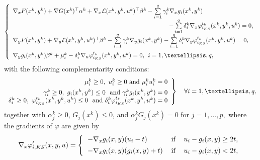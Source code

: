       	\begin{equation}
       	\left\{
       	\begin{array}
       	[c]{l}
       	\nabla_{x}F(x^{k},y^{k})+\nabla G(x^{k})^{\top}\alpha^{k}+\nabla
       	_{x}\mathcal{L}(x^{k},y^{k},u^{k})^{\top}\beta^{k}-\sum\limits_{i=1}^{q}
       	\gamma_{i}^{k}\nabla_{x}g_{i}(x^{k},y^{k})\\
       	\qquad \qquad \qquad \qquad \qquad \qquad \qquad \qquad \qquad\qquad \qquad \qquad \quad \;\, -\sum\limits_{i=1}^{q}\delta_{i}^{k}\nabla_{x}\varphi_{{i}_{KS}}^{t_{k}}(x^{k},y^{k},u^{k})=0,\\
       	\nabla_{y}F(x^{k},y^{k})+\nabla_{y}\mathcal{L}(x^{k},y^{k},u^{k})^{\top}
       	\beta^{k}-\sum\limits_{i=1}^{q}\gamma_{i}^{k}\nabla_{y}g_{i}(x^{k},y^{k}
       	)
       	-\sum\limits_{i=1}^{q}\delta_{i}^{k}\nabla_{y}\varphi_{{i}_{KS}}^{t_{k}}(x^{k},y^{k},u^{k})=0,\medskip \\
       	\nabla_{y}g_{i}(x^{k},y^{k})\beta^{k}+\mu_{i}^{k}-\delta_{i}^{k}\nabla_{u}
       	\varphi_{{i}_{KS}}^{t_{k}}(x^{k},y^{k},u^{k})=0, \;\, i=1,\ldots,q,
       	\end{array}
       	\right. \label{k13bis}
       	\end{equation}
       	with the following complementarity conditions:
       	\begin{equation}
       	\left.
       	\begin{array}[c]{r}
       	\mu_{i}^{k}\geq0,\text{ }u_{i}^{k}\geq0\text{\ and }\mu_{i}^{k}u_{i}%
       	^{k}=0\\[1ex]%
       	\gamma_{i}^{k}\geq0,\text{ }g_{i}(x^{k},y^{k})\leq0\text{ \ and }\gamma
       	_{i}^{k}g_{i}(x^{k},y^{k})=0\\
       	\delta_{i}^{k}\geq0,\text{ }\varphi_{{i}_{KS}}^{t_{k}}(x^{k},y^{k},u^{k})\leq0\text{ \ and
       	}\delta_{i}^{k}\varphi_{{i}_{KS}}^{t_{k}}(x^{k},y^{k},u^{k})=0
       	\end{array}
       	\right\}  \text{ \ \ }\forall i=1,\ldots,q,\label{k14}
       	\end{equation}
       	together with
       	$
       	\alpha_{j}^{k}\geq0$, $G_{j}(x^{k})\leq 0$, and $\alpha_{j}^{k}
       	G_{j}(x^{k})=0$ for $j=1,\ldots, p,
       	$
        where the gradients of $\varphi$ are given by
\begin{equation}
\nabla_{x}\varphi^{t}_{i,KS}(x,y,u)=\left\{
\begin{tabular}
[c]{lll}
$-\nabla_{x}g_{i}(x,y)(u_{i}-t)$ & if & $u_{i}-g_{i}(x,y)\geq2t,$\\[1ex]
$-\nabla_{x}g_{i}(x,y)(g_{i}(x,y)+t)$ & if & $u_{i}-g_{i}(x,y)<2t,$
\end{tabular}
\right. \label{dx}
\end{equation}
